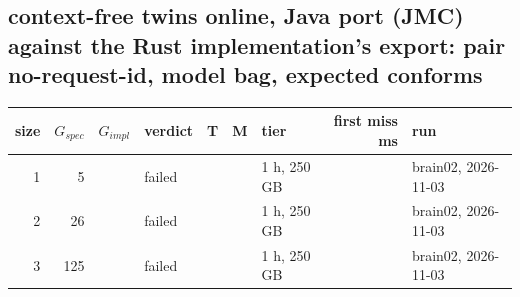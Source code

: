 \documentclass[10pt]{article}
\begin{document}
\subsection*{context-free twins online, Java port (JMC) against the Rust implementation's export: pair \textsf{no-request-id}, model bag, expected conforms}
\begin{longtable}{@{}rrrlrrlrl@{}}
\toprule
size & $G_{\mathit{spec}}$ & $G_{\mathit{impl}}$ & verdict & T & M & tier & first miss ms & run \\
\midrule
\endhead
\color{blue} 1 & 5 &  & failed &  &  & 1 h, 250 GB &  & brain02, 2026-11-03 \\
\color{blue} 2 & 26 &  & failed &  &  & 1 h, 250 GB &  & brain02, 2026-11-03 \\
\color{blue} 3 & 125 &  & failed &  &  & 1 h, 250 GB &  & brain02, 2026-11-03 \\
\bottomrule
\end{longtable}
\end{document}
